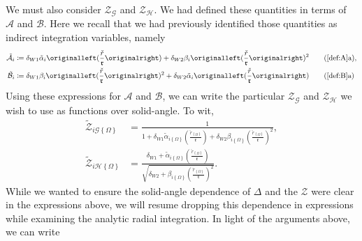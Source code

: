 We must also consider $\mathcal{Z}_{\mathcal{G}}$ and
$\mathcal{Z}_{\mathcal{H}}$. We had defined these quantities in terms of
$\mathcal{A}$ and $\mathcal{B}$. Here we recall that we had previously
identified those quantities as indirect integration variables, namely
\begin{align}
\tilde{\mathcal{A}}_{i}
    &\coloneqq
        \delta_{W1}
        \tilde{\alpha}_{i}
        \left(\frac{\check{r}}{\mathfrak{r}}\right)
            +
        \delta_{W2}
        \beta_{i}
        \left(\frac{\check{r}}{\mathfrak{r}}\right)^{2}
\tag{\ref{def:A}a}
,\\
\tilde{\mathcal{B}}_{i}
    &\coloneqq
        \delta_{W1}
        \beta_{i}
        \left(\frac{\check{r}}{\mathfrak{r}}\right)^{2}
            +
        \delta_{W2}
        \tilde{\alpha}_{i}
        \left(\frac{\check{r}}{\mathfrak{r}}\right) 
\tag{\ref{def:B}a}
\end{align}
Using these expressions for $\mathcal{A}$ and $\mathcal{B}$, we can write the
particular $\mathcal{Z}_{\mathcal{G}}$ and $\mathcal{Z}_{\mathcal{H}}$ we wish
to use as functions over solid-angle. To wit,
\begin{align}
\tilde{\mathcal{Z}}_{i\mathcal{G}\left\{\Omega\right\}}
&=
    \frac
    {1}
    {
        1
            +
        \delta_{W1}
        \tilde{\alpha}_{i\left\{\Omega\right\}}
        \left(\frac{ \check{r}_{\left\{\Omega\right\}} }{ \mathfrak{r} }\right)
            +
        \delta_{W2}
        \beta_{i\left\{\Omega\right\}}
        \left(
            \frac{ \check{r}_{\left\{\Omega\right\}} }{ \mathfrak{r} }
        \right)^{2}
    }
,\\
\tilde{\mathcal{Z}}_{i\mathcal{H}\left\{\Omega\right\}}
&=
    \frac
    {
        \delta_{W1}
            +
        \tilde{\alpha}_{i\left\{\Omega\right\}}
        \left(\frac{ \check{r}_{\left\{\Omega\right\}} }{ \mathfrak{r} }\right)
    }
    {
        \sqrt{
            \delta_{W2}
                +
            \beta_{i\left\{\Omega\right\}}
            \left(
                \frac{ \check{r}_{\left\{\Omega\right\}} }{ \mathfrak{r} }
            \right)^{2}
        }
    }    
.
\end{align}
While we wanted to ensure the solid-angle dependence of $\Delta$ and the
$\mathcal{Z}$ were clear in the expressions above, we will resume dropping this
dependence in expressions while examining the analytic radial integration. In
light of the arguments above, we can write
